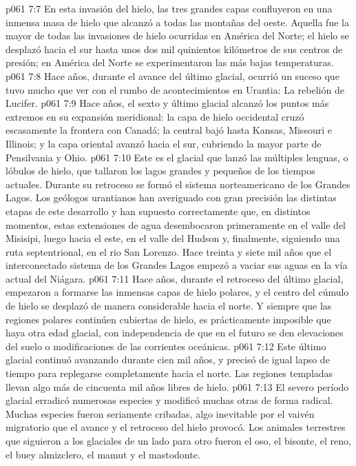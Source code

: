 \vs p061 7:7 En esta invasión del hielo, las tres grandes capas confluyeron en una inmensa masa de hielo que alcanzó a todas las montañas del oeste. Aquella fue la mayor de todas las invasiones de hielo ocurridas en América del Norte; el hielo se desplazó hacia el sur hasta unos dos mil quinientos kilómetros de sus centros de presión; en América del Norte se experimentaron las más bajas temperaturas.
\vs p061 7:8 \pc Hace  años, durante el avance del último glacial, ocurrió un suceso que tuvo mucho que ver con el rumbo de acontecimientos en Urantia: La rebelión de Lucifer.
\vs p061 7:9 \pc Hace  años, el sexto y último glacial alcanzó los puntos más extremos en su expansión meridional: la capa de hielo occidental cruzó escasamente la frontera con Canadá; la central bajó hasta Kansas, Missouri e Illinois; y la capa oriental avanzó hacia el sur, cubriendo la mayor parte de Pensilvania y Ohio.
\vs p061 7:10 Este es el glacial que lanzó las múltiples lenguas, o lóbulos de hielo, que tallaron los lagos grandes y pequeños de los tiempos actuales. Durante su retroceso se formó el sistema norteamericano de los Grandes Lagos. Los geólogos urantianos han averiguado con gran precisión las distintas etapas de este desarrollo y han supuesto correctamente que, en distintos momentos, estas extensiones de agua desembocaron primeramente en el valle del Misisipi, luego hacia el este, en el valle del Hudson y, finalmente, siguiendo una ruta septentrional, en el rio San Lorenzo. Hace treinta y siete mil años que el interconectado sistema de los Grandes Lagos empezó a vaciar sus aguas en la vía actual del Niágara.
\vs p061 7:11 \pc Hace  años, durante el retroceso del último glacial, empezaron a formarse las inmensas capas de hielo polares, y el centro del cúmulo de hielo se desplazó de manera considerable hacia el norte. Y siempre que las regiones polares continúen cubiertas de hielo, es prácticamente imposible que haya otra edad glacial, con independencia de que en el futuro se den elevaciones del suelo o modificaciones de las corrientes oceánicas.
\vs p061 7:12 Este último glacial continuó avanzando durante cien mil años, y precisó de igual lapso de tiempo para replegarse completamente hacia el norte. Las regiones templadas llevan algo más de cincuenta mil años libres de hielo.
\vs p061 7:13 El severo período glacial erradicó numerosas especies y modificó muchas otras de forma radical. Muchas especies fueron seriamente cribadas, algo inevitable por el vaivén migratorio que el avance y el retroceso del hielo provocó. Los animales terrestres que siguieron a los glaciales de un lado para otro fueron el oso, el bisonte, el reno, el buey almizclero, el mamut y el mastodonte.
